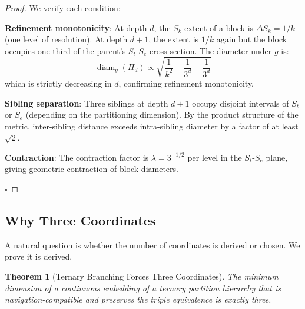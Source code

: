 \documentclass[12pt,twocolumn]{article}
\newtheorem{theorem}{Theorem}[section]
\DeclareMathOperator{\diam}{diam}
\begin{document}
\begin{proof}
We verify each condition:

\textbf{Refinement monotonicity}: At depth $d$, the $S_k$-extent of a block is $\Delta S_k = 1/k$ (one level of resolution). At depth $d+1$, the extent is $1/k$ again but the block occupies one-third of the parent's $S_t$-$S_e$ cross-section. The diameter under $g$ is:
\begin{equation}
\diam_g(\Pi_d) \propto \sqrt{\frac{1}{k^2} + \frac{1}{3^d} + \frac{1}{3^d}}
\end{equation}
which is strictly decreasing in $d$, confirming refinement monotonicity.

\textbf{Sibling separation}: Three siblings at depth $d+1$ occupy disjoint intervals of $S_t$ or $S_e$ (depending on the partitioning dimension). By the product structure of the metric, inter-sibling distance exceeds intra-sibling diameter by a factor of at least $\sqrt{2}$.

\textbf{Contraction}: The contraction factor is $\lambda = 3^{-1/2}$ per level in the $S_t$-$S_e$ plane, giving geometric contraction of block diameters.

$\square$
\end{proof}

\subsection{Why Three Coordinates}

A natural question is whether the number of coordinates is derived or chosen. We prove it is derived.

\begin{theorem}[Ternary Branching Forces Three Coordinates]
\label{thm:three_coordinates}
The minimum dimension of a continuous embedding of a ternary partition hierarchy that is navigation-compatible and preserves the triple equivalence is exactly three.
\end{theorem}
\end{document}
